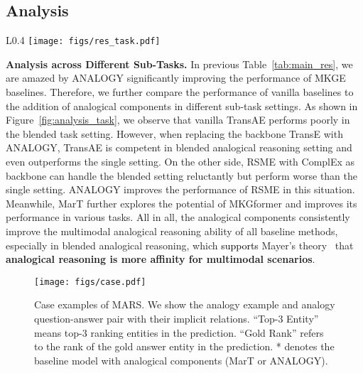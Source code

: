 \documentclass{article} \usepackage{iclr2023_conference,times}
\newcommand{\ours}{MarT}
\newcommand{\data}{MARS}
\begin{document}
\subsection{Analysis}

\begin{wrapfigure}{L}{0.4\textwidth}
\centering \texttt{[image: figs/res\_task.pdf]}
\caption{Performance on {\data} in different sub-task settings.}
\label{fig:analysis_task}
\vspace{-0.1cm}
\end{wrapfigure}
\textbf{Analysis across Different Sub-Tasks.}
In previous Table~\ref{tab:main_res}, we are amazed by ANALOGY significantly improving the performance of MKGE baselines.
Therefore, we further compare the performance of vanilla baselines to the addition of analogical components in different sub-task settings. 
As shown in Figure~\ref{fig:analysis_task}, we observe that vanilla TransAE performs poorly in the blended task setting. 
However, when replacing the backbone TransE with ANALOGY, TransAE is competent in blended analogical reasoning setting and even outperforms the single setting. 
On the other side, RSME with ComplEx as backbone can handle the blended setting reluctantly but perform worse than the single setting.
ANALOGY improves the performance of RSME in this situation. 
Meanwhile, {\ours} further explores the potential of MKGformer and improves its performance in various tasks. 
All in all, the analogical components consistently improve the multimodal analogical reasoning ability of all baseline methods,  especially in blended analogical reasoning, which \textcolor{black}{supports} Mayer's theory~\citep{mayer2002multimedia} that \textbf{analogical reasoning is more affinity for multimodal scenarios}.

 
\begin{figure}[!t]
\centering
\texttt{[image: figs/case.pdf]}
\caption{
Case examples of {\data}. We show the analogy example and analogy question-answer pair with their implicit relations.
``Top-3 Entity'' means top-3 ranking entities in the prediction.
``Gold Rank'' refers to the rank of the gold answer entity in the prediction. * denotes the baseline model with analogical components ({\ours} or ANALOGY).}
\label{fig:case}
\end{figure}
\end{document}
